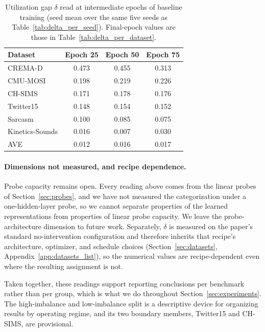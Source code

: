 \documentclass{article}
\begin{document}
\begin{table}[H]
\centering
\caption{Utilization gap $\delta$ read at intermediate epochs of baseline training (seed mean over the same five seeds as Table~\ref{tab:delta_per_seed}). Final-epoch values are those in Table~\ref{tab:delta_per_dataset}.}
\label{tab:delta_by_epoch}
\vspace{0.3em}
\begin{tabular}{lccc}
\toprule
\textbf{Dataset} & \textbf{Epoch 25} & \textbf{Epoch 50} & \textbf{Epoch 75} \\
\midrule
CREMA-D         & 0.473 & 0.455 & 0.313 \\
CMU-MOSI        & 0.198 & 0.219 & 0.226 \\
CH-SIMS         & 0.171 & 0.178 & 0.176 \\
Twitter15       & 0.148 & 0.154 & 0.152 \\
Sarcasm         & 0.100 & 0.085 & 0.075 \\
Kinetics-Sounds & 0.016 & 0.007 & 0.030 \\
AVE             & 0.012 & 0.016 & 0.017 \\
\bottomrule
\end{tabular}
\end{table}

\paragraph{Dimensions not measured, and recipe dependence.} Probe capacity remains open. Every reading above comes from the linear probes of Section~\ref{sec:probes}, and we have not measured the categorization under a one-hidden-layer probe, so we cannot separate properties of the learned representations from properties of linear probe capacity. We leave the probe-architecture dimension to future work. Separately, $\delta$ is measured on the paper's standard no-intervention configuration and therefore inherits that recipe's architecture, optimizer, and schedule choices (Section~\ref{sec:datasets}, Appendix~\ref{app:datasets_list}), so the numerical values are recipe-dependent even where the resulting assignment is not.

Taken together, these readings support reporting conclusions per benchmark rather than per group, which is what we do throughout Section~\ref{sec:experiments}. The high-imbalance and low-imbalance split is a descriptive device for organizing results by operating regime, and its two boundary members, Twitter15 and CH-SIMS, are provisional.
\end{document}
